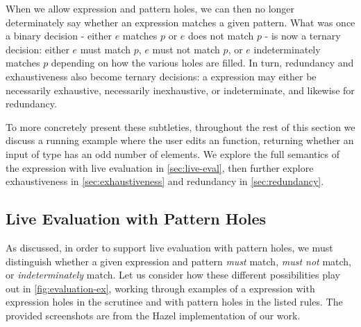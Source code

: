 When we allow expression and pattern holes, we can then no longer determinately say whether an expression matches a given pattern. What was once a binary decision - either $e$ matches $p$ or $e$ does not match $p$ - is now a ternary decision: either $e$ must match $p$, $e$ must not match $p$, or $e$ indeterminately matches $p$ depending on how the various holes are filled. In turn, redundancy and exhaustiveness also become ternary decisions: a  expression may either be necessarily exhaustive, necessarily inexhaustive, or indeterminate, and likewise for redundancy. 

To more concretely present these subtleties, throughout the rest of this section we discuss a running example where the user edits an  function, returning whether an input of type \li{[Int]} has an odd number of elements. We explore the full semantics of the  expression with live evaluation in \autoref{sec:live-eval}, then further explore exhaustiveness in \autoref{sec:exhaustiveness} and redundancy in \autoref{sec:redundancy}.

\subsection{Live Evaluation with Pattern Holes}\label{sec:live-eval}

As discussed, in order to support live evaluation with pattern holes, we must distinguish whether a given expression and pattern \emph{must} match, \emph{must not} match, or \emph{indeterminately} match. Let us consider how these different possibilities play out in \autoref{fig:evaluation-ex}, working through examples of a  expression with expression holes in the scrutinee and with pattern holes in the listed rules. The provided screenshots are from the Hazel implementation of our work.

